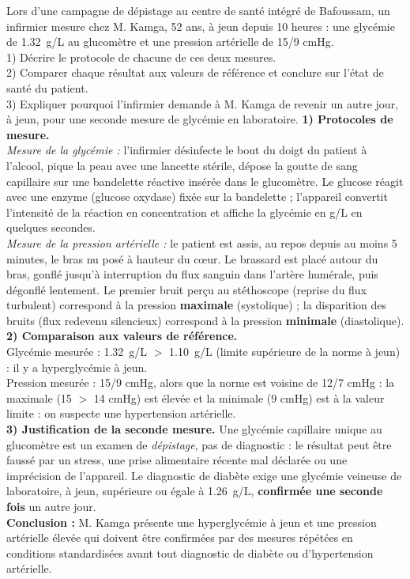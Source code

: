 \documentclass[11pt]{article}
\newcommand{\cle}[1]{{\popxbold\color{popdark}#1}}
\begin{document}
\begin{exoresolu}
Lors d'une campagne de dépistage au centre de santé intégré de Bafoussam, un infirmier mesure chez M. Kamga, 52 ans, à jeun depuis 10 heures : une glycémie de \SI{1,32}{g/L} au glucomètre et une pression artérielle de 15/9 cmHg.\\
1) Décrire le protocole de chacune de ces deux mesures.\\
2) Comparer chaque résultat aux valeurs de référence et conclure sur l'état de santé du patient.\\
3) Expliquer pourquoi l'infirmier demande à M. Kamga de revenir un autre jour, à jeun, pour une seconde mesure de glycémie en laboratoire.
\tcblower
\textbf{1) Protocoles de mesure.}\\
\emph{Mesure de la glycémie :} l'infirmier désinfecte le bout du doigt du patient à l'alcool, pique la peau avec une lancette stérile, dépose la goutte de sang capillaire sur une bandelette réactive insérée dans le glucomètre. Le glucose réagit avec une enzyme (glucose oxydase) fixée sur la bandelette ; l'appareil convertit l'intensité de la réaction en concentration et affiche la glycémie en g/L en quelques secondes.\\
\emph{Mesure de la pression artérielle :} le patient est assis, au repos depuis au moins 5 minutes, le bras nu posé à hauteur du c\oe ur. Le brassard est placé autour du bras, gonflé jusqu'à interruption du flux sanguin dans l'artère humérale, puis dégonflé lentement. Le premier bruit perçu au stéthoscope (reprise du flux turbulent) correspond à la pression \textbf{maximale} (systolique) ; la disparition des bruits (flux redevenu silencieux) correspond à la pression \textbf{minimale} (diastolique).\\[2mm]
\textbf{2) Comparaison aux valeurs de référence.}\\
Glycémie mesurée : \SI{1,32}{g/L} $>$ \SI{1,10}{g/L} (limite supérieure de la norme à jeun) : il y a \cle{hyperglycémie} à jeun.\\
Pression mesurée : 15/9 cmHg, alors que la norme est voisine de 12/7 cmHg : la maximale (15 $>$ 14 cmHg) est élevée et la minimale (9 cmHg) est à la valeur limite : on suspecte une \cle{hypertension artérielle}.\\[2mm]
\textbf{3) Justification de la seconde mesure.} Une glycémie capillaire unique au glucomètre est un examen de \emph{dépistage}, pas de diagnostic : le résultat peut être faussé par un stress, une prise alimentaire récente mal déclarée ou une imprécision de l'appareil. Le diagnostic de diabète exige une glycémie veineuse de laboratoire, à jeun, supérieure ou égale à \SI{1,26}{g/L}, \textbf{confirmée une seconde fois} un autre jour.\\
\textbf{Conclusion :} M. Kamga présente une hyperglycémie à jeun et une pression artérielle élevée qui doivent être confirmées par des mesures répétées en conditions standardisées avant tout diagnostic de diabète ou d'hypertension artérielle.
\end{exoresolu}
\end{document}
